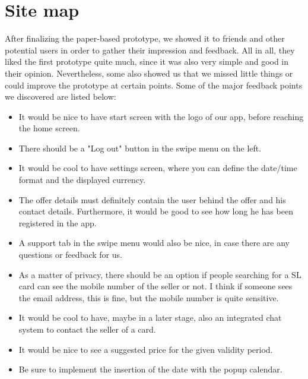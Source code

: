 \documentclass[11pt,twoside,a4paper]{report}
\begin{document}
\section{Site map}

After finalizing the paper-based prototype, we showed it to friends and other potential users in order to gather their impression and feedback. All in all, they liked the first prototype quite much, since it was also very simple and good in their opinion. Nevertheless, some also showed us that we missed little things or could improve the prototype at certain points. Some of the major feedback points we discovered are listed below:

\begin{itemize}

\item It would be nice to have start screen with the logo of our app, before reaching the home screen.

\item There should be a "Log out" button in the swipe menu on the left.

\item It would be cool to have settings screen, where you can define the date/time format and the displayed currency.

\item The offer details must definitely contain the user behind the offer and his contact details. Furthermore, it would be good to see how long he has been registered in the app.

\item A support tab in the swipe menu would also be nice, in case there are any questions or feedback for us.

\item As a matter of privacy, there should be an option if people searching for a SL card can see the mobile number of the seller or not. I think if someone sees the email address, this is fine, but the mobile number is quite sensitive.

\item It would be cool to have, maybe in a later stage, also an integrated chat system to contact the seller of a card.

\item It would be nice to see a suggested price for the given validity period.

\item Be sure to implement the insertion of the date with the popup calendar.


\end{itemize}
\end{document}

